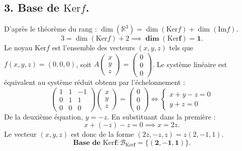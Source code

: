 \documentclass[french]{yLectureNote}
\begin{document}
\subsection*{3. Base de $\mathrm{Ker}f$.}
D'après le théorème du rang : $\dim(\mathbb{R}^3) = \dim(\mathrm{Ker}f) + \dim(\mathrm{Im}f)$.
$$3 = \dim(\mathrm{Ker}f) + 2 \implies \mathbf{\dim(\mathrm{Ker}f) = 1}.$$
Le noyau $\mathrm{Ker}f$ est l'ensemble des vecteurs $(x,y,z)$ tels que $f(x,y,z) = (0,0,0)$, soit $A \begin{pmatrix} x \\ y \\ z \end{pmatrix} = \begin{pmatrix} 0 \\ 0 \\ 0 \end{pmatrix}$.
Le système linéaire est équivalent au système réduit obtenu par l'échelonnement :
$$\begin{pmatrix} 1 & 1 & -1 \\ 0 & 1 & 1 \\ 0 & 0 & 0 \end{pmatrix} \begin{pmatrix} x \\ y \\ z \end{pmatrix} = \begin{pmatrix} 0 \\ 0 \\ 0 \end{pmatrix} \iff \begin{cases} x+y-z = 0 \\ y+z = 0 \end{cases}$$
De la deuxième équation, $y = -z$. En substituant dans la première :
$$x + (-z) - z = 0 \implies x = 2z.$$
Le vecteur $(x,y,z)$ est donc de la forme $(2z, -z, z) = z(2, -1, 1)$.
$$\mathbf{\text{Base de } \mathrm{Ker}f : \mathcal{B}_{\mathrm{Ker}f} = \{(2,-1,1)\}.}$$
\end{document}
